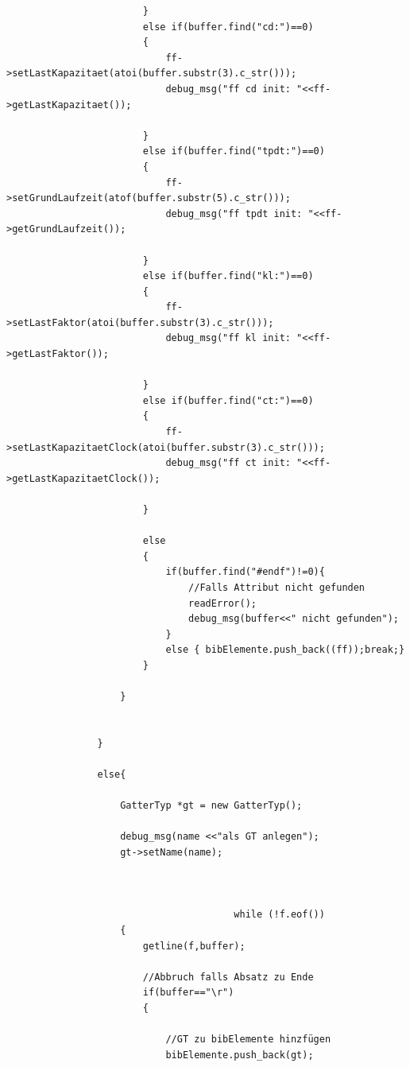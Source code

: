 \documentclass[a4paper,10pt,twoside]{report}
\begin{document}
\begin{lstlisting}
                        }
                        else if(buffer.find("cd:")==0)
                        {
                            ff->setLastKapazitaet(atoi(buffer.substr(3).c_str()));
                            debug_msg("ff cd init: "<<ff->getLastKapazitaet());

                        }
                        else if(buffer.find("tpdt:")==0)
                        {
                            ff->setGrundLaufzeit(atof(buffer.substr(5).c_str()));
                            debug_msg("ff tpdt init: "<<ff->getGrundLaufzeit());

                        }
                        else if(buffer.find("kl:")==0)
                        {
                            ff->setLastFaktor(atoi(buffer.substr(3).c_str()));
                            debug_msg("ff kl init: "<<ff->getLastFaktor());

                        }
                        else if(buffer.find("ct:")==0)
                        {
                            ff->setLastKapazitaetClock(atoi(buffer.substr(3).c_str()));
                            debug_msg("ff ct init: "<<ff->getLastKapazitaetClock());

                        }

                        else
                        {
                            if(buffer.find("#endf")!=0){
                                //Falls Attribut nicht gefunden
                                readError();
                                debug_msg(buffer<<" nicht gefunden");
                            }
                            else { bibElemente.push_back((ff));break;}
                        }

                    }


                }

                else{

                    GatterTyp *gt = new GatterTyp();

                    debug_msg(name <<"als GT anlegen");
                    gt->setName(name);



                                        while (!f.eof())
                    {
                        getline(f,buffer);

                        //Abbruch falls Absatz zu Ende
                        if(buffer=="\r")
                        {

                            //GT zu bibElemente hinzfügen
                            bibElemente.push_back(gt);






\end{lstlisting}
\end{document}
